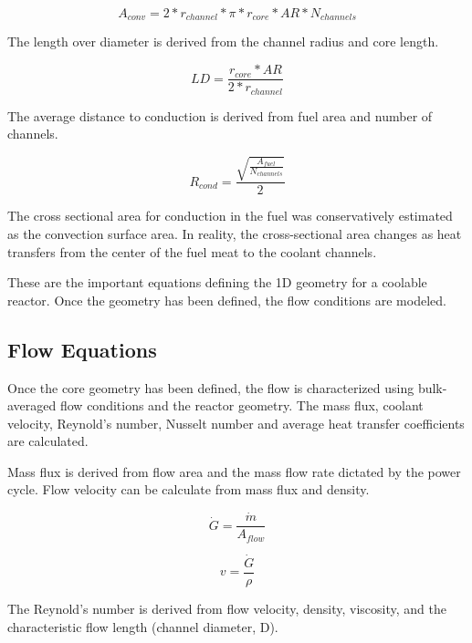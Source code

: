 \begin{equation}
    A_{conv} = 2*r_{channel}*\pi*r_{core}*AR*N_{channels}    
\end{equation}

The length over diameter is derived from the channel radius and core length.

\begin{equation}
    LD = \frac{r_{core}*AR}{2*r_{channel}}
\end{equation}

The average distance to conduction is derived from fuel area and number of
channels.

\begin{equation}
    R_{cond} = \frac{\sqrt{\frac{A_{fuel}}{N_{channels}}}}{2}
    \label{r_cond}
\end{equation}

The cross sectional area for conduction in the fuel was conservatively estimated
as the convection surface area. In reality, the cross-sectional area changes as
heat transfers from the center of the fuel meat to the coolant channels.


These are the important equations defining the 1D geometry for a coolable
reactor. Once the geometry has been defined, the flow conditions are modeled.

\subsection{Flow Equations}

Once the core geometry has been defined, the flow is characterized using
bulk-averaged flow conditions and the reactor geometry. The mass flux, coolant
velocity, Reynold's number, Nusselt number and average heat transfer
coefficients are calculated.

Mass flux is derived from flow area and the mass flow rate dictated by the power
cycle. Flow velocity can be calculate from mass flux and density.

\begin{equation}
    \dot{G} = \frac{\dot{m}}{A_{flow}}
\end{equation}

\begin{equation}
    v = \frac{\dot{G}}{\rho}
\end{equation}

The Reynold's number is derived from flow velocity, density, viscosity, and the
characteristic flow length (channel diameter, D).

